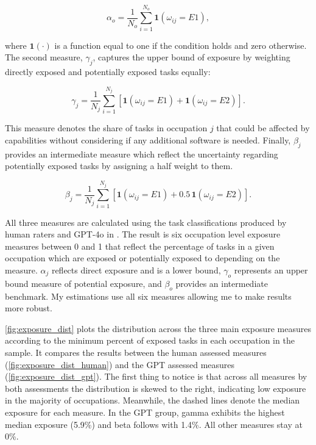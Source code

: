 \[ \alpha_o = \frac{1}{N_o} \sum_{i=1}^{N_o} \mathbf{1}(\omega_{ij} = E1), \]

where $\mathbf{1}(\cdot)$ is a function equal to one if the condition holds and zero otherwise. The second measure, $\gamma_j$, captures the upper bound of exposure by weighting directly exposed and potentially exposed tasks equally:

\[ \gamma_j = \frac{1}{N_j} \sum_{i=1}^{N_j} \left[ \mathbf{1}(\omega_{ij} = E1) + \mathbf{1}(\omega_{ij} = E2) \right]. \]

This measure denotes the share of tasks in occupation $j$ that could be affected by  capabilities without considering if any additional software is needed. Finally, $\beta_j$ provides an intermediate measure which reflect the uncertainty regarding potentially exposed tasks by assigning a half weight to them.

\[ \beta_j = \frac{1}{N_j} \sum_{i=1}^{N_j} \left[ \mathbf{1}(\omega_{ij} = E1) + 0.5\,\mathbf{1}(\omega_{ij} = E2) \right]. \]

All three measures are calculated using the task classifications produced by human raters and GPT-4o in \cite{martinez2024risk}. The result is six occupation level exposure measures between 0 and 1 that reflect the percentage of tasks in a given occupation which are exposed or potentially exposed to  depending on the measure. $\alpha_j$ reflects direct exposure and is a lower bound, $\gamma_o$ represents an upper bound measure of potential exposure, and $\beta_o$ provides an intermediate benchmark. My estimations use all six measures allowing me to make results more robust.

\cref{fig:exposure_dist} plots the distribution across the three main exposure measures according to the minimum percent of exposed tasks in each occupation in the sample. It compares the results between the human assessed measures (\cref{fig:exposure_dist_human}) and the GPT assessed measures (\cref{fig:exposure_dist_gpt}). The first thing to notice is that across all measures by both assessments the distribution is skewed to the right, indicating low exposure in the majority of occupations. Meanwhile, the dashed lines denote the median exposure for each measure. In the GPT group, gamma exhibits the highest median exposure (5.9\%) and beta follows with 1.4\%. All other measures stay at 0\%.

